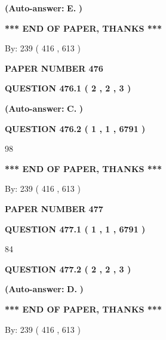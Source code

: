 \documentclass[12pt]{article}
\begin{document}
 
{\textbf{(Auto-answer:}}
{\textbf{\large{
E.}}}
{\textbf{)}}
 
 
   
   
   
   
\vspace{1.0in} 
{\textbf{\large{ *** END OF PAPER, THANKS *** }}} 
   
   
\hspace{1.0in} By: 
 239 ( 416 ,  613 )
   
   
   
   
\newpage 
\setcounter{page}{ 
   476001 } 
   
   
 {\textbf{ \Large{ PAPER NUMBER  476  }}}
   
   
   
   
  
  
{\textbf{\large{QUESTION
476.1 
 ( 2 , 2 , 3 )
}}}
 
 
{\textbf{(Auto-answer:}}
{\textbf{\large{
C.}}}
{\textbf{)}}
 
 
  
  
{\textbf{\large{QUESTION
476.2 
 ( 1 , 1 , 6791 )
}}}

98
   
   
   
   
\vspace{1.0in} 
{\textbf{\large{ *** END OF PAPER, THANKS *** }}} 
   
   
\hspace{1.0in} By: 
 239 ( 416 ,  613 )
   
   
   
   
\newpage 
\setcounter{page}{ 
   477001 } 
   
   
 {\textbf{ \Large{ PAPER NUMBER  477  }}}
   
   
   
   
  
  
{\textbf{\large{QUESTION
477.1 
 ( 1 , 1 , 6791 )
}}}

84
  
  
{\textbf{\large{QUESTION
477.2 
 ( 2 , 2 , 3 )
}}}
 
 
{\textbf{(Auto-answer:}}
{\textbf{\large{
D.}}}
{\textbf{)}}
 
 
   
   
   
   
\vspace{1.0in} 
{\textbf{\large{ *** END OF PAPER, THANKS *** }}} 
   
   
\hspace{1.0in} By: 
 239 ( 416 ,  613 )
   
   
   
\end{document}
